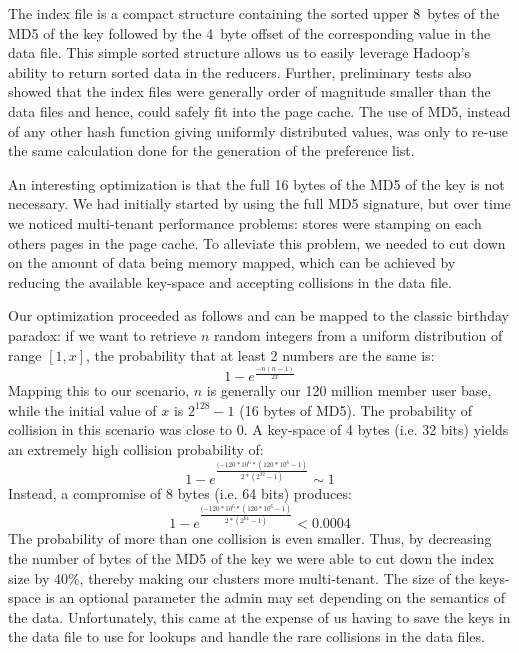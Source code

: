 The index file is a compact structure containing the sorted upper
8~bytes of the MD5 of the key followed by the 4~byte offset of the
corresponding value in the data file. This simple sorted structure
allows us to easily leverage Hadoop's ability to return sorted data
in the reducers. Further, preliminary tests also showed that the
index files were generally order of magnitude smaller than the data
files and hence, could safely fit into the page cache. The use of
MD5, instead of any other hash function giving uniformly distributed
values, was only to re-use the same calculation done for the generation
of the preference list. 

An interesting optimization is that the full 16 bytes of the MD5 of
the key is not necessary. We had initially started by using the full
MD5 signature, but over time we noticed multi-tenant performance
problems: stores were stamping on each others pages in the page cache.
To alleviate this problem, we needed to cut down on the amount of data
being memory mapped, which can be achieved by reducing the available
key-space and accepting collisions in the data file. 

Our optimization proceeded as follows and can be mapped to the classic
birthday paradox: if we want to retrieve $n$ random integers from a
uniform distribution of range $[1, x]$, the probability that at least
2 numbers are the same is:
\begin{equation}
1 - e^{\frac{-n(n-1)}{2x}}
\end{equation}
Mapping this to our scenario, $n$ is generally our 120 million member
user base, while the initial value of $x$ is $2^{128} - 1$ (16 bytes
of MD5). The probability of collision in this scenario was close to 0.
A key-space of 4 bytes (i.e. 32 bits) yields an extremely high
collision probability of:
\begin{equation}
1 - e^{\frac{(-120*10^{6} * (120*10^{6} - 1)}{2 * (2^{32} - 1)}} \sim 1
\end{equation}
Instead, a compromise of 8 bytes (i.e. 64 bits) produces:
\begin{equation} 
1 - e^{\frac{(-120*10^{6} * (120*10^{6} - 1)} { 2 * (2^{64} - 1 )}} < 0.0004
\end{equation}
The probability of more than one collision is even smaller. Thus, by
decreasing the number of bytes of the MD5 of the key we were able to
cut down the index size by 40\%, thereby making our clusters more
multi-tenant. The size of the keys-space is an optional parameter the
admin may set depending on the semantics of the data. Unfortunately,
this came at the expense of us having to save the keys in the data
file to use for lookups and handle the rare collisions in the data
files.

